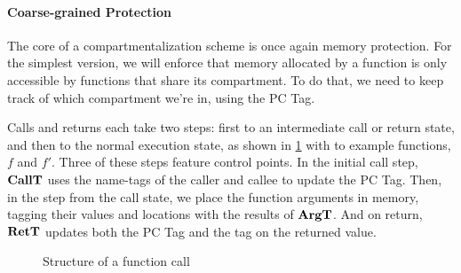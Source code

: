 \documentclass[acmsmall,review,anonymous]{acmart}\settopmatter{printfolios=true,printccs=false,printacmref=false}
\begin{document}
\paragraph{Coarse-grained Protection}

%
The core of a compartmentalization scheme is once again memory protection. For the simplest version,
we will enforce that memory allocated by a function is only accessible by functions that share its
compartment. To do that, we need to keep track of which compartment we're in, using the PC Tag.

Calls and returns each take two steps: first to an intermediate call or return state, and
then to the normal execution state, as shown in \cref{fig:functions} with to example functions,
\(f\) and \(f'\). Three of these steps feature control points. In the initial call step, \(\mathbf{CallT}\)
uses the name-tags of the caller and callee to update the PC Tag. Then, in the step from the call
state, we place the function arguments in memory, tagging their values and locations with
the results of \(\mathbf{ArgT}\). And on return, \(\mathbf{RetT}\) updates both the PC Tag and
the tag on the returned value.

\begin{figure}

  \caption{Structure of a function call}
  \label{fig:functions}
\end{figure}
\end{document}
